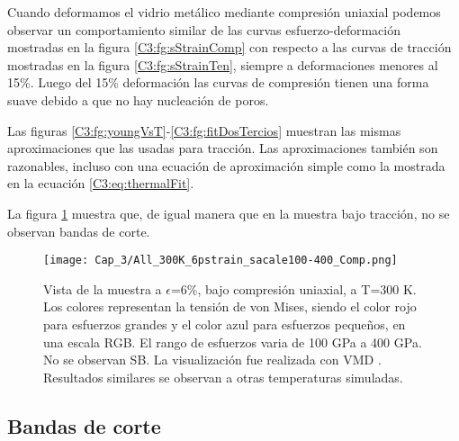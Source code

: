 Cuando deformamos el vidrio metálico mediante compresión uniaxial podemos observar un comportamiento similar de las curvas esfuerzo-deformación mostradas en la figura \ref{C3:fg:sStrainComp} con respecto a las curvas de tracción mostradas en la figura \ref{C3:fg:sStrainTen}, siempre a deformaciones menores al 15\%. Luego del 15\% deformación las curvas de compresión tienen una forma suave debido a que no hay nucleación de poros.


Las figuras \ref{C3:fg:youngVsT}-\ref{C3:fg:fitDosTercios} muestran las mismas aproximaciones que las usadas para tracción. Las aproximaciones también son razonables, incluso con una ecuación de aproximación simple como la mostrada en la ecuación \ref{C3:eq:thermalFit}.


La figura \ref{C3:fg:sampleComp} muestra que, de igual manera que en la muestra bajo tracción, no se observan bandas de corte.


\begin{figure}[htp]
\centering
\texttt{[image: Cap\_3/All\_300K\_6pstrain\_sacale100-400\_Comp.png]}
\caption[Vista de la muestra a $\epsilon$=6\%, bajo compresión uniaxial, a T=300 K.]{Vista de la muestra a $\epsilon$=6\%, bajo compresión uniaxial, a T=300 K. Los colores representan la tensión de von Mises, siendo el color rojo para esfuerzos grandes y el color azul para esfuerzos pequeños, en una escala RGB. El rango de esfuerzos varia de 100 GPa a 400 GPa. No se observan SB. La visualización fue realizada con VMD \citep{humphrey96}. Resultados similares se observan a otras temperaturas simuladas.}
\label{C3:fg:sampleComp}
\end{figure}

\subsection{Bandas de corte}
\label{ss:BC}

